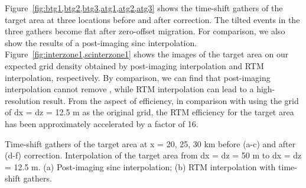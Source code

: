 Figure~\ref{fig:btg1,btg2,btg3,atg1,atg2,atg3} shows the time-shift gathers of the target area at three locations before and after correction.
The tilted events in the three gathers become flat after zero-offset migration.
 For comparison, we also show the results of a post-imaging sinc interpolation.
Figure~\ref{fig:interzone1,scinterzone1} shows the images of the target area on our expected grid density 
obtained by post-imaging interpolation and RTM interpolation, respectively.
By comparison, we can find that  post-imaging interpolation cannot remove 
,
while RTM interpolation can lead to a high-resolution result.
From the aspect of efficiency, in comparison with using the grid of dx = dz = 12.5 m as the original grid, the RTM efficiency for the target area has been approximately accelerated by a factor of 16.

{Time-shift gathers of the target area at x = 20, 25, 30 km before (a-c) and after (d-f) correction.}
{Interpolation of the target area from dx = dz = 50 m to dx = dz = 12.5 m. 
(a) Post-imaging sinc interpolation; (b) RTM interpolation with time-shift gathers.}


